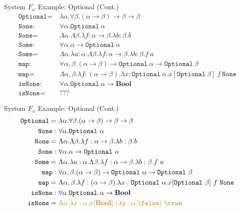 \documentclass[leqno,presentation,usenames,dvipsnames]{beamer}
\newcommand{\bool}{\textbf{Bool}}
\begin{document}
\begin{frame}[fragile]{System $F_\omega$ Example: Optional (Cont.)}
    \small
    \begin{align*}
        \texttt{Optional} = &~\lambda \alpha. \forall \beta. (\alpha \to \beta) \to \beta \to \beta \\
        \texttt{None} : &~ \forall \alpha. \texttt{Optional}~\alpha \\
        \texttt{None} = &~ \Lambda \alpha. \Lambda \beta. \lambda f : \alpha \to \beta. \lambda b : \beta. b \\
        \texttt{Some} : &~ \forall \alpha. \alpha \to \texttt{Optional}~\alpha \\
        \texttt{Some} = &~ \Lambda \alpha. \lambda a : \alpha. \Lambda \beta. \lambda f : \alpha \to \beta. \lambda b : \beta. f~a \\
        \texttt{map} : &~ \forall \alpha, \beta. (\alpha \to \beta) \to \texttt{Optional}~\alpha \to \texttt{Optional}~\beta \\
        \texttt{map} = &~ \Lambda \alpha, \beta. \lambda f : (\alpha \to \beta). \lambda x : \texttt{Optional}~\alpha. x[\texttt{Optional}~\beta]~f~\texttt{None} \\
        \texttt{isNone} : &~ \forall \alpha. \texttt{Optional}~\alpha \to \bool \\
        \texttt{isNone} = &~ ???
    \end{align*}
\end{frame}

\begin{frame}[fragile]{System $F_\omega$ Example: Optional (Cont.)}
    \small
    \begin{align*}
        \texttt{Optional} = &~\lambda \alpha. \forall \beta. (\alpha \to \beta) \to \beta \to \beta \\
        \texttt{None} : &~ \forall \alpha. \texttt{Optional}~\alpha \\
        \texttt{None} = &~ \Lambda \alpha. \Lambda \beta. \lambda f : \alpha \to \beta. \lambda b : \beta. b \\
        \texttt{Some} : &~ \forall \alpha. \alpha \to \texttt{Optional}~\alpha \\
        \texttt{Some} = &~ \Lambda \alpha. \lambda a : \alpha. \Lambda \beta. \lambda f : \alpha \to \beta. \lambda b : \beta. f~a \\
        \texttt{map} : &~ \forall \alpha, \beta. (\alpha \to \beta) \to \texttt{Optional}~\alpha \to \texttt{Optional}~\beta \\
        \texttt{map} = &~ \Lambda \alpha, \beta. \lambda f : (\alpha \to \beta). \lambda x : \texttt{Optional}~\alpha. x[\texttt{Optional}~\beta]~f~\texttt{None} \\
        \texttt{isNone} : &~ \forall \alpha. \texttt{Optional}~\alpha \to \bool \\
        \texttt{isNone} = &~ \color{deepOrange}\Lambda \alpha. \lambda x : \alpha. x[\bool]~(\lambda y : \alpha. \false)~\true
    \end{align*}
\end{frame}
\end{document}
